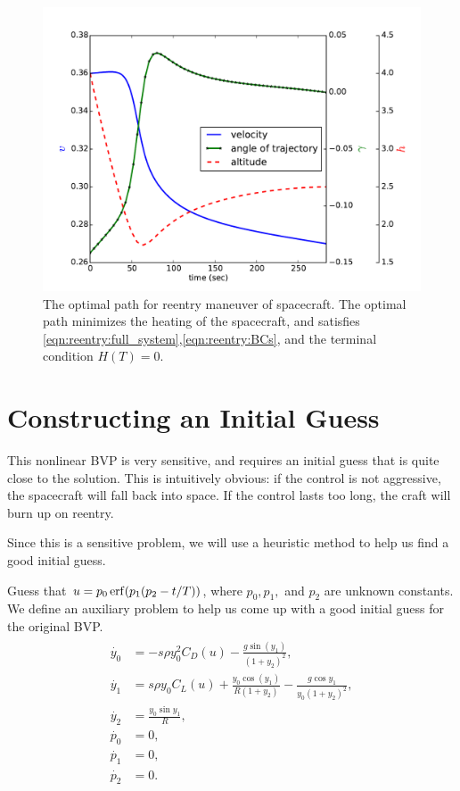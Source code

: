 \begin{figure}
\centering
\includegraphics[width=\textwidth]{solutions.pdf}
\caption{The optimal path for reentry maneuver of spacecraft. The optimal path minimizes the heating of the spacecraft, and satisfies \eqref{eqn:reentry:full_system},\eqref{eqn:reentry:BCs}, and the terminal condition $H(T) = 0$.
}
\label{fig:reentry:solutions}
\end{figure}



\section*{Constructing an Initial Guess}
This nonlinear BVP is very sensitive, and requires an initial guess that is quite close to the solution.  
This is intuitively obvious: if the control is not aggressive, the spacecraft will fall back into space. 
If the control lasts too long, the craft will burn up on reentry. 

Since this is a sensitive problem, we will use a heuristic method to help us find a good initial guess.

Guess that $u = p_0\operatorname{erf}(p_1(p_2-t/T))$, where $p_0, p_1,$ and $p_2$ are unknown constants. 
We define an auxiliary problem to help us come up with a good initial guess for the original BVP. 
\begin{align}
\begin{split}
\dot{y_0} &= -s\rho y_0^2C_D(u) - \frac{g\sin(y_1)}{(1+y_2)^2},\\
\dot{y_1} &= s \rho y_0 C_L(u) + \frac{y_0 \cos(y_1)}{R(1+y_2)} - \frac{g \cos y_1}{y_0(1+y_2)^2},\\
\dot{y_2} &= \frac{y_0 \sin y_1}{R} ,\\
\dot{p_0} &= 0, \\
\dot{p_1} &= 0, \\
\dot{p_2} &= 0.
\end{split} \label{eqn:reentry:control_system_auxiliary}
\end{align}



